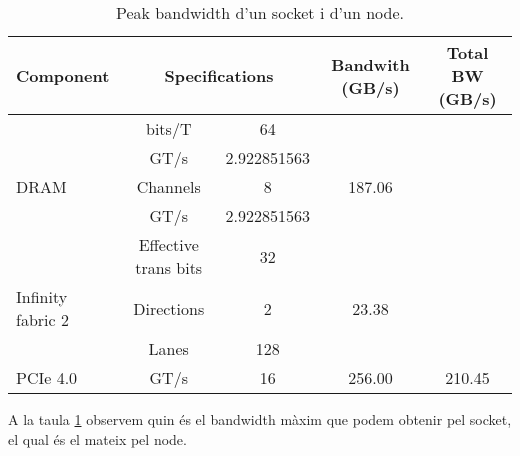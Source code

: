 \begin{table}[h]
\begin{adjustwidth}{-1.5in}{-1.5in}
\begin{center}
\begin{tabular}{l|c|c||c|c}
    \hline
Component                           & \multicolumn{2}{c||}{Specifications}                                         & Bandwith (GB/s)          & Total BW (GB/s)          \\ \hline  \hline 
                                    & \cellcolor[HTML]{EFEFEF}bits/T               & \cellcolor[HTML]{EFEFEF}64  &                          &                          \\
                                    & GT/s                                         & 2.922851563                 &                          &                          \\
    \multirow{-3}{*}{DRAM}              & \cellcolor[HTML]{EFEFEF}Channels             & \cellcolor[HTML]{EFEFEF}8   & \multirow{-3}{*}{187.06} &                          \\ \cline{1-4}
                                    & GT/s                                         & 2.922851563                 &                          &                          \\
                                    & \cellcolor[HTML]{EFEFEF}Effective trans bits & \cellcolor[HTML]{EFEFEF}32  &                          &                          \\
    \multirow{-3}{*}{Infinity fabric 2} & Directions                                   & 2                           & \multirow{-3}{*}{23.38}  &                          \\ \cline{1-4}
                                    & \cellcolor[HTML]{EFEFEF}Lanes                & \cellcolor[HTML]{EFEFEF}128 &                          &                          \\
\multirow{-2}{*}{PCIe 4.0}          & GT/s                                         & 16                          & \multirow{-2}{*}{256.00} & \multirow{-8}{*}{210.45} \\ \hline
\end{tabular}
    \caption{Peak bandwidth d'un socket i d'un node.}
    \label{tab:peak_bw}
\end{center}
\end{adjustwidth}
\end{table}

A la taula \ref{tab:peak_bw} observem quin és el bandwidth màxim que podem obtenir pel socket, el qual és el mateix pel node.

